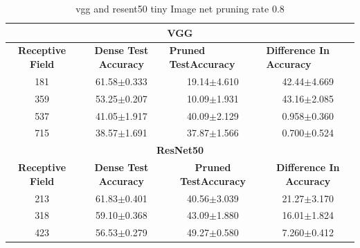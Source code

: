 \begin{table}[]
\begin{tabular}{@{}cccc@{}}
\toprule
\multicolumn{4}{c}{\textbf{VGG}}                                                                                                                                  \\ \midrule
\textbf{Receptive Field} & \textbf{Dense Test Accuracy} & \multicolumn{1}{l}{\textbf{Pruned  TestAccuracy}} & \multicolumn{1}{l}{\textbf{Difference In Accuracy}} \\ \midrule
181                      & 61.58$\pm$0.333              & 19.14$\pm$4.610                                   & 42.44$\pm$4.669                                     \\
359                      & 53.25$\pm$0.207              & 10.09$\pm$1.931                                   & 43.16$\pm$2.085                                     \\
537                      & 41.05$\pm$1.917              & 40.09$\pm$2.129                                   & 0.958$\pm$0.360                                     \\
715                      & 38.57$\pm$1.691              & 37.87$\pm$1.566                                   & 0.700$\pm$0.524                                     \\ \midrule
\multicolumn{4}{c}{\textbf{ResNet50}}                                                                                                                             \\ \midrule
\textbf{Receptive Field} & \textbf{Dense Test Accuracy} & \textbf{Pruned  TestAccuracy}                     & \textbf{Difference In Accuracy}                     \\
213                      & 61.83$\pm$0.401              & 40.56$\pm$3.039                                   & 21.27$\pm$3.170                                     \\
318                      & 59.10$\pm$0.368              & 43.09$\pm$1.880                                   & 16.01$\pm$1.824                                     \\
423                      & 56.53$\pm$0.279              & 49.27$\pm$0.580                                   & 7.260$\pm$0.412                                     \\ \bottomrule
\end{tabular}
\caption{vgg and resent50 tiny Image net pruning rate 0.8}
\label{tab:tiny imagenet pruning rate08}
\end{table}


